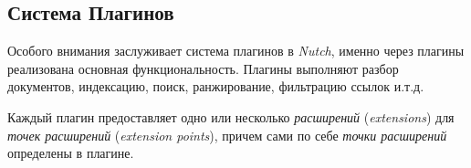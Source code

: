 \subsection{Система Плагинов}
Особого внимания заслуживает система плагинов в \textit{Nutch}, именно через плагины реализована основная функциональность. Плагины выполняют разбор документов, индексацию, поиск, ранжирование, фильтрацию ссылок и.т.д.

Каждый плагин предоставляет одно или несколько \textit{расширений} (\textit{extensions}) для \textit{точек расширений} (\textit{extension points}), причем сами по себе \textit{точки расширений} определены в плагине.